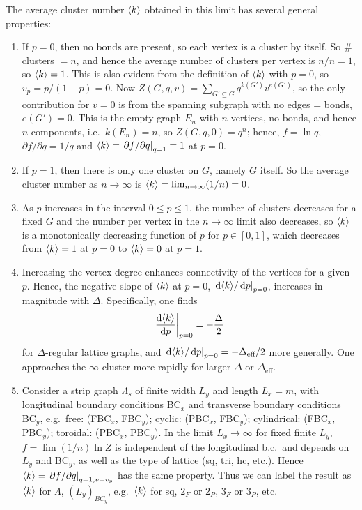 The average cluster number $\langle k\rangle$ obtained in this limit has several general properties:
\begin{enumerate}[label=(\arabic*)]
  \item If $p = 0$, then no bonds are present, so each vertex is a cluster by itself. So \# clusters $= n$, and hence the
    average number of clusters per vertex is $n/n = 1$, so $\langle k\rangle = 1$. This is also evident from the definition of
    $\langle k\rangle$ with $p = 0$, so $v_p = p/(1-p) = 0$. Now $Z(G,q,v) = \sum_{G'\subseteq G}q^{k(G')}v^{e(G')}$, so the only
    contribution for $v = 0$ is from the spanning subgraph with no edges = bonds, $e(G') = 0$. This is the empty graph $E_n$
    with $n$ vertices, no bonds, and hence $n$ components, i.e.\ $k(E_n) = n$, so $Z(G,q,0) = q^n$; hence, $f = \ln q$,
    $\partial f/\partial q = 1/q$ and $\langle k\rangle = \left.\partial f/\partial q\right|_{q=1} = 1$ at $p = 0$.
  \item If $p = 1$, then there is only one cluster on $G$, namely $G$ itself. So the average cluster number as $n\to\infty$
    is $\langle k\rangle = \lim_{n\to\infty}(1/n) = 0$.
  \item As $p$ increases in the interval $0\le p\le 1$, the number of clusters decreases for a fixed $G$ and the number per
    vertex in the $n\to\infty$ limit also decreases, so $\langle k\rangle$ is a monotonically decreasing function of $p$ for
    $p\in[0,1]$, which decreases from $\langle k\rangle = 1$ at $p = 0$ to $\langle k\rangle = 0$ at $p = 1$.
  \item Increasing the vertex degree enhances connectivity of the vertices for a given $p$. Hence, the negative slope of
    $\langle k\rangle$ at $p = 0$, $\left.\mathop{}\!\mathrm{d}\langle k\rangle/\mathop{}\!\mathrm{d} p\right|_{p=0}$, increases in magnitude with $\Delta$. Specifically, one finds
    \begin{equation}
      \left.\frac{\mathop{}\!\mathrm{d}\langle k\rangle}{\mathop{}\!\mathrm{d} p}\right|_{p=0} = -\frac{\Delta}{2}
    \end{equation}
    for $\Delta$-regular lattice graphs, and $\left.\mathop{}\!\mathrm{d}\langle k\rangle/\mathop{}\!\mathrm{d} p\right|_{p=0} = -\Delta_{\text{eff}}/2$ more
    generally.
    One approaches the $\infty$ cluster more rapidly for larger $\Delta$ or $\Delta_{\text{eff}}$.
  \item Consider a strip graph $\Lambda_s$ of finite width $L_y$ and length $L_x = m$, with longitudinal boundary conditions
    BC$_x$ and transverse boundary conditions BC$_y$, e.g.\ free: (FBC$_x$, FBC$_y$); cyclic: (PBC$_x$, FBC$_y$);
    cylindrical: (FBC$_x$, PBC$_y$); toroidal: (PBC$_x$, PBC$_y$). In the limit $L_x\to\infty$ for fixed finite $L_y$,
    $f = \lim(1/n)\ln Z$ is independent of the longitudinal b.c.\ and depends on $L_y$ and BC$_y$, as well as the type of
    lattice (sq, tri, hc, etc.). Hence $\langle k\rangle = \left.\partial f/\partial q\right|_{q=1,v=v_p}$ has the same property. Thus we can label the
    result as $\langle k\rangle$ for $\Lambda$, $(L_y)_{BC_y}$, e.g.\ $\langle k\rangle$ for sq, $2_F$ or $2_P$, $3_F$ or $3_P$, etc.
\end{enumerate}

